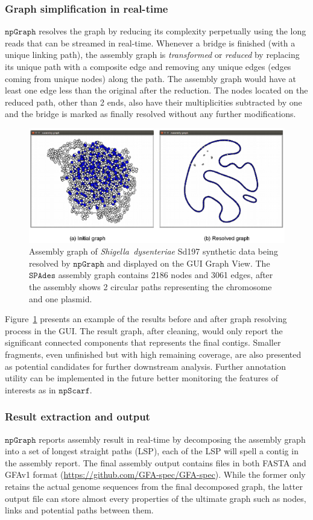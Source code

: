 \documentclass[10pt,letterpaper]{article}
\newcommand{\npscarf}{$\mathtt{npScarf}$}
\newcommand{\npgraph}{$\mathtt{npGraph}$}
\newcommand{\spades}{$\mathtt{SPAdes}$}
\begin{document}
\subsubsection*{Graph simplification in real-time}
\npgraph{} resolves the graph by reducing its complexity perpetually using the long reads that can be streamed in real-time.
Whenever a bridge is finished (with a unique linking path), the assembly graph is \emph{transformed} or \emph{reduced} by replacing its unique path with a composite edge and removing any unique edges (edges coming from unique nodes) along the path. The assembly graph would have at least one edge less than the original after the reduction. The nodes located on the reduced path, other than 2 ends, also have their multiplicities subtracted by one and the bridge is marked as finally resolved without any further modifications. 

\begin{figure}[!hpt]
\centering
 \includegraphics[width=\textwidth]{images/Fig4.eps}
\caption{Assembly graph of \emph{Shigella~dysenteriae} Sd197 synthetic data being resolved by \npgraph{} and displayed on the GUI Graph View. The \spades{} assembly graph contains 2186 nodes and 3061 edges, after the assembly shows 2 circular paths representing the chromosome and one plasmid.}
\label{figure:npgraph_graphview}
\end{figure}

Figure~\ref{figure:npgraph_graphview} presents an example of the results before and after graph resolving process in the GUI.
The result graph, after cleaning, would only report the significant connected components that represents the final contigs.
Smaller fragments, even unfinished but with high remaining coverage, are also presented as potential candidates for further downstream analysis.
Further annotation utility can be implemented in the future better monitoring the features of interests as in \npscarf{}.
\subsubsection*{Result extraction and output}
\npgraph{} reports assembly result in real-time by decomposing the assembly graph into a set of longest straight paths (LSP), each of the LSP will spell a contig in the assembly report.
The final assembly output contains files in both FASTA and GFAv1 format (\url{https://github.com/GFA-spec/GFA-spec}). While the former only retains the actual genome sequences from the final decomposed graph, the latter output file can store almost every properties of the ultimate graph such as nodes, links and potential paths between them.
\end{document}
